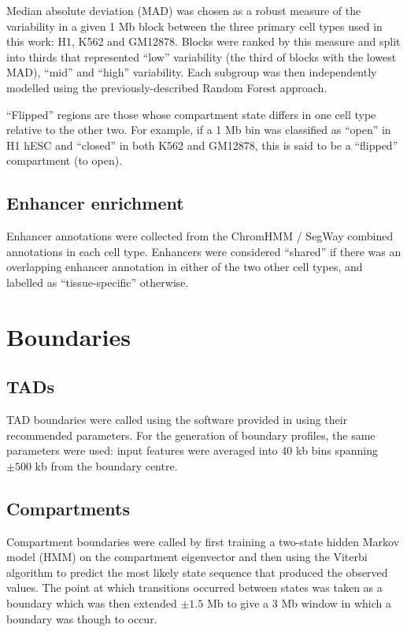 \documentclass[a4paper,10pt,oneside]{book}
\begin{document}
Median absolute deviation (MAD) was chosen as a robust measure of the
variability in a given 1 Mb block between the three primary cell types
used in this work: H1, K562 and GM12878. Blocks were ranked by this
measure and split into thirds that represented ``low'' variability (the
third of blocks with the lowest MAD), ``mid'' and ``high'' variability.
Each subgroup was then independently modelled using the
previously-described Random Forest approach.

``Flipped'' regions are those whose compartment state differs in one
cell type relative to the other two. For example, if a 1 Mb bin was
classified as ``open'' in H1 hESC and ``closed'' in both K562 and
GM12878, this is said to be a ``flipped'' compartment (to open).

\subsection{Enhancer enrichment}\label{enhancer-enrichment}

Enhancer annotations were collected from the ChromHMM / SegWay combined
annotations in each cell type.\citep{Hoffman2013} Enhancers were
considered ``shared'' if there was an overlapping enhancer annotation in
either of the two other cell types, and labelled as ``tissue-specific''
otherwise.

\section{Boundaries}\label{boundaries}

\subsection{TADs}\label{tads}

TAD boundaries were called using the software provided in
\citet{Dixon2012} using their recommended parameters. For the generation
of boundary profiles, the same parameters were used: input features were
averaged into 40 kb bins spanning $\pm500$ kb from the boundary centre.

\subsection{Compartments}\label{sec:compartments}

Compartment boundaries were called by first training a two-state hidden
Markov model (HMM) on the compartment eigenvector and then using the
Viterbi algorithm to predict the most likely state sequence that
produced the observed values. The point at which transitions occurred
between states was taken as a boundary which was then extended $\pm 1.5$
Mb to give a 3 Mb window in which a boundary was though to occur.
\end{document}
